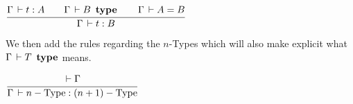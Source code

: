 \documentclass[a4paper,english]{lipics-utf8x}
\begin{document}
  \begin{center}
  \(
    \ru{\Gamma \der t : A \qquad
        \Gamma \der B \type \qquad
        \Gamma \der A = B
      }{\Gamma \der t : B}
  \)
  \end{center}

  \noindent %
  We then add the rules regarding the $n$-Types which will also make explicit
  what $\Gamma \,\vdash T \operatorname{\ \mathbf{type}}$ means.

  \begin{center}
  \(
    \ru{\der \Gamma
      }{\Gamma \der n-\Type : (n+1)-\Type}
  \)
  \end{center}

%
%
\end{document}

